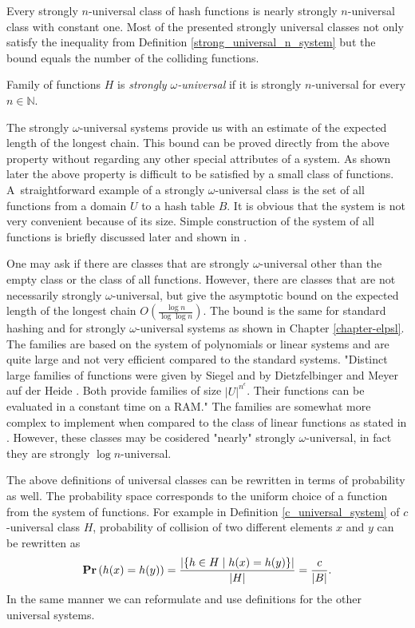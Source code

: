 Every strongly $n$-universal class of hash functions is nearly strongly $n$-universal class with constant one. Most of the presented strongly universal classes not only satisfy the inequality from Definition \ref{strong_universal_n_system} but the bound equals the number of the colliding functions.

\begin{definition}
\label{strong_universal_omega_system}
Family of functions $H$ is \emph{strongly $\omega$-universal} if it is strongly $n$-universal for every $n \in \mathbb{N}$.
\end{definition}

The strongly $\omega$-universal systems provide us with an estimate of the expected length of the longest chain. This bound can be proved directly from the above property without regarding any other special attributes of a system. As shown later the above property is difficult to be satisfied by a small class of functions. A~straightforward example of a strongly $\omega$-universal class is the set of all functions from a domain $U$ to a hash table $B$. It is obvious that the system is not very convenient because of its size. Simple construction of the system of all functions is briefly discussed later and shown in \cite{1382617}.

One may ask if there are classes that are strongly $\omega$-universal other than the empty class or the class of all functions. However, there are classes that are not necessarily strongly $\omega$-universal, but give the asymptotic bound on the expected length of the longest chain $O\left(\frac{\log n}{\log \log n}\right)$. The bound is the same for standard hashing and for strongly $\omega$-universal systems as shown in Chapter \ref{chapter-elpsl}. The families are based on the system of polynomials or linear systems and are quite large and not very efficient compared to the standard systems. "Distinct large families of functions were given by Siegel \cite{90406} and by Dietzfelbinger and Meyer auf der Heide \cite{1398663}. Both provide families of size $|U|^{n^\epsilon}$. Their functions can be evaluated in a constant time on a RAM." The families are somewhat more complex to implement when compared to the class of linear functions as stated in \cite{1382617}. However, these classes may be cosidered "nearly" strongly $\omega$-universal, in fact they are strongly $\log n$-universal.

The above definitions of universal classes can be rewritten in terms of probability as well. The probability space corresponds to the uniform choice of a function from the system of functions. For example in Definition \ref{c_universal_system} of $c$-universal class $H$, probability of collision of two different elements $x$ and $y$ can be rewritten as
\[
	\mathbf{Pr}\left(h(x) = h(y)\right) = \frac{|\{h \in H \mid h(x) = h(y)\}|}{|H|} = \frac{c}{|B|} \text{.}
\]
In the same manner we can reformulate and use definitions for the other universal systems.

